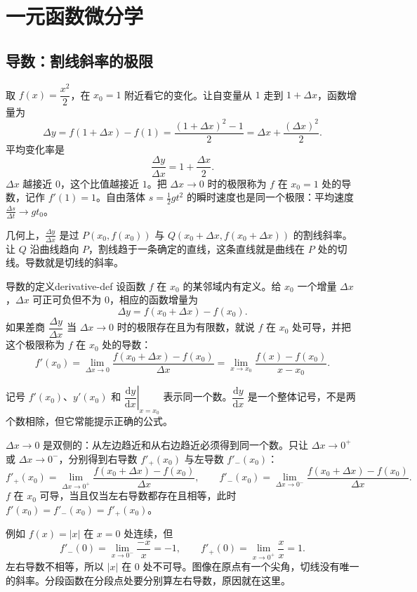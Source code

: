 \section{一元函数微分学}
\subsection{导数：割线斜率的极限}

取 $f(x)=\dfrac{x^2}{2}$，在 $x_0=1$ 附近看它的变化。让自变量从 $1$ 走到 $1+\Delta x$，函数增量为
\[
\Delta y=f(1+\Delta x)-f(1)
=\frac{(1+\Delta x)^2-1}{2}
=\Delta x+\frac{(\Delta x)^2}{2}.
\]
平均变化率是
\[
\frac{\Delta y}{\Delta x}=1+\frac{\Delta x}{2}.
\]
$\Delta x$ 越接近 $0$，这个比值越接近 $1$。把 $\Delta x\to0$ 时的极限称为 $f$ 在 $x_0=1$ 处的导数，记作 $f'(1)=1$。自由落体 $s=\frac12gt^2$ 的瞬时速度也是同一个极限：平均速度 $\frac{\Delta s}{\Delta t}\to gt_0$。

几何上，$\frac{\Delta y}{\Delta x}$ 是过 $P(x_0,f(x_0))$ 与 $Q(x_0+\Delta x,f(x_0+\Delta x))$ 的割线斜率。让 $Q$ 沿曲线趋向 $P$，割线趋于一条确定的直线，这条直线就是曲线在 $P$ 处的切线。导数就是切线的斜率。

\begin{mydef}{导数的定义}{derivative-def}
设函数 $f$ 在 $x_0$ 的某邻域内有定义。给 $x_0$ 一个增量 $\Delta x$，$\Delta x$ 可正可负但不为 $0$，相应的函数增量为
\[
\Delta y=f(x_0+\Delta x)-f(x_0).
\]
如果差商 $\dfrac{\Delta y}{\Delta x}$ 当 $\Delta x\to0$ 时的极限存在且为有限数，就说 $f$ 在 $x_0$ 处可导，并把这个极限称为 $f$ 在 $x_0$ 处的导数：
\[
f'(x_0)
=\lim_{\Delta x\to0}\frac{f(x_0+\Delta x)-f(x_0)}{\Delta x}
=\lim_{x\to x_0}\frac{f(x)-f(x_0)}{x-x_0}.
\]
\end{mydef}

记号 $f'(x_0)$、$y'(x_0)$ 和 $\left.\dfrac{\mathrm{d}y}{\mathrm{d}x}\right|_{x=x_0}$ 表示同一个数。$\dfrac{\mathrm{d}y}{\mathrm{d}x}$ 是一个整体记号，不是两个数相除，但它常能提示正确的公式。

$\Delta x\to0$ 是双侧的：从左边趋近和从右边趋近必须得到同一个数。只让 $\Delta x\to0^+$ 或 $\Delta x\to0^-$，分别得到右导数 $f'_+(x_0)$ 与左导数 $f'_-(x_0)$：
\[
f'_+(x_0)=\lim_{\Delta x\to0^+}\frac{f(x_0+\Delta x)-f(x_0)}{\Delta x},\qquad
f'_-(x_0)=\lim_{\Delta x\to0^-}\frac{f(x_0+\Delta x)-f(x_0)}{\Delta x}.
\]
$f$ 在 $x_0$ 可导，当且仅当左右导数都存在且相等，此时 $f'(x_0)=f'_-(x_0)=f'_+(x_0)$。

例如 $f(x)=|x|$ 在 $x=0$ 处连续，但
\[
f'_-(0)=\lim_{x\to0^-}\frac{-x}{x}=-1,\qquad
f'_+(0)=\lim_{x\to0^+}\frac{x}{x}=1.
\]
左右导数不相等，所以 $|x|$ 在 $0$ 处不可导。图像在原点有一个尖角，切线没有唯一的斜率。分段函数在分段点处要分别算左右导数，原因就在这里。

